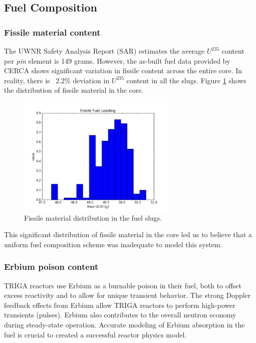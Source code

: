 \documentclass{UWNR_modeling}
\begin{document}
\subsection{Fuel Composition}
\subsubsection{Fissile material content}
The UWNR Safety Analysis Report (SAR) estimates the average $U^{235}$ content per \emph{pin} element is 149 grams\cite{SAR}. However, the as-built fuel data provided by CERCA shows significant variation in fissile content across the entire core. In reality, there is ~2.2\% deviation in $U^{235}$ content in all the slugs. Figure \ref{fig:235_dist} shows the distribution of fissile material in the core.

\begin{figure}[H]
  \centering
  \includegraphics[width=3in]{mass235.jpeg}
  \caption{Fissile material distribution in the fuel slugs.}
  \label{fig:235_dist}
\end{figure}

\noindent
This significant distribution of fissile material in the core led us to believe that a uniform fuel composition scheme was inadequate to model this system.



\subsubsection{Erbium poison content}

TRIGA reactors use Erbium as a burnable poison in their fuel, both to offset excess reactivity and to allow for unique transient behavior\cite{NRAD}. The strong Doppler feedback effects from Erbium allow TRIGA reactors to perform high-power transients (pulses). Erbium also contributes to the overall neutron economy during steady-state operation. Accurate modeling of Erbium absorption in the fuel is crucial to created a successful reactor physics model.
\end{document}
